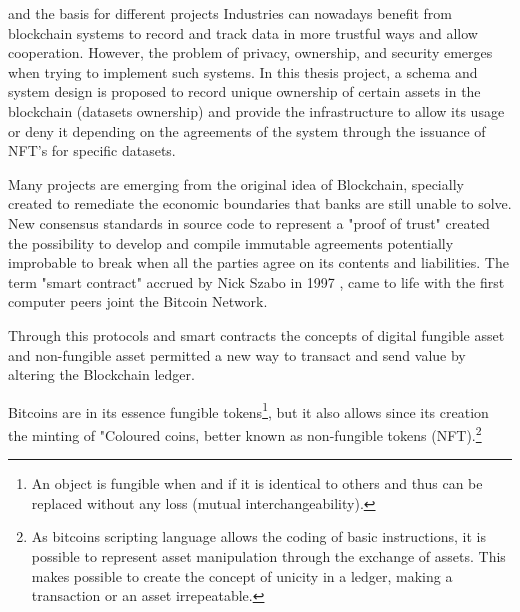 {{  and the basis for different projects 
Industries can nowadays benefit from blockchain systems to record and track data in more trustful ways and allow cooperation. However, the problem of privacy, ownership, and security emerges when trying to implement such systems. In this thesis project, a schema and system design is proposed to record unique ownership of certain assets in the blockchain (datasets ownership) and provide the infrastructure to allow its usage or deny it depending on the agreements of the system through the issuance of NFT's for specific datasets.



Many projects are emerging from the original idea of Blockchain, specially created to remediate the economic boundaries that banks are still unable to solve. New consensus standards in source code to represent a "proof of trust" created the possibility to develop and compile immutable agreements potentially improbable to break when all the parties agree on its contents and liabilities. The term "smart contract" accrued by Nick Szabo in 1997 \cite{szabo1997formalizing}, came to life with the first computer peers joint the Bitcoin Network.

Through this protocols and smart contracts the concepts of digital fungible asset and  non-fungible asset permitted a new way to transact and send value by altering the Blockchain ledger.

Bitcoins are in its essence fungible tokens\footnote{An object is fungible when and if it is identical to others and thus can be replaced without any loss (mutual interchangeability).}, but it also allows since its creation the minting of "Coloured coins, better known as non-fungible tokens (NFT).\footnote{As bitcoins scripting language allows the coding of basic instructions, it is possible to represent asset manipulation through the exchange of assets. This makes possible to create the concept of unicity in a ledger, making a transaction or an asset irrepeatable.}





}}
